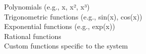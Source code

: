 \documentclass[preview]{standalone}
\begin{document}
Polynomials (e.g., x, x², x³)\\Trigonometric functions (e.g., sin(x), cos(x))\\Exponential functions (e.g., exp(x))\\Rational functions\\Custom functions specific to the system\\
\end{document}
